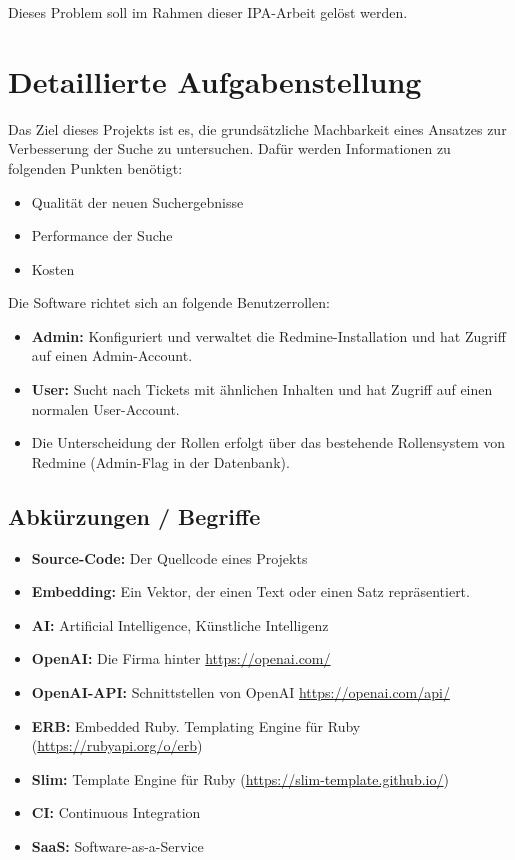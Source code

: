 Dieses Problem soll im Rahmen dieser IPA-Arbeit gelöst werden.

\section{Detaillierte Aufgabenstellung}

Das Ziel dieses Projekts ist es, die grundsätzliche Machbarkeit eines Ansatzes zur Verbesserung der Suche zu untersuchen. Dafür werden Informationen zu folgenden Punkten benötigt:

\begin{itemize}
    \item Qualität der neuen Suchergebnisse
    \item Performance der Suche
    \item Kosten
\end{itemize}

Die Software richtet sich an folgende Benutzerrollen:

\begin{itemize}
    \item \textbf{Admin:} Konfiguriert und verwaltet die Redmine-Installation und hat Zugriff auf einen Admin-Account.
    \item \textbf{User:} Sucht nach Tickets mit ähnlichen Inhalten und hat Zugriff auf einen normalen User-Account.
    \item Die Unterscheidung der Rollen erfolgt über das bestehende Rollensystem von Redmine (Admin-Flag in der Datenbank).
\end{itemize}

\subsection{Abkürzungen / Begriffe}

\begin{itemize}
    \item \textbf{Source-Code:} Der Quellcode eines Projekts
    \item \textbf{Embedding:} Ein Vektor, der einen Text oder einen Satz repräsentiert.
    \item \textbf{AI:} Artificial Intelligence, Künstliche Intelligenz
    \item \textbf{OpenAI:} Die Firma hinter \url{https://openai.com/}
    \item \textbf{OpenAI-API:} Schnittstellen von OpenAI \url{https://openai.com/api/}
    \item \textbf{ERB:} Embedded Ruby. Templating Engine für Ruby (\url{https://rubyapi.org/o/erb})
    \item \textbf{Slim:} Template Engine für Ruby (\url{https://slim-template.github.io/})
    \item \textbf{CI:} Continuous Integration
    \item \textbf{SaaS:} Software-as-a-Service
\end{itemize}


